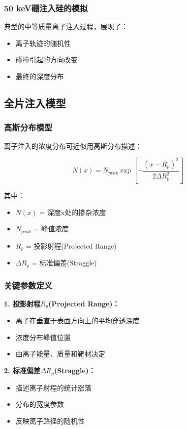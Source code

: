 \documentclass[UTF8,12pt,a4paper]{ctexart}
\begin{document}
\subsubsection{50 keV硼注入硅的模拟}

典型的中等质量离子注入过程，展现了：
\begin{itemize}
    \item 离子轨迹的随机性
    \item 碰撞引起的方向改变
    \item 最终的深度分布
\end{itemize}

\subsection{全片注入模型}

\subsubsection{高斯分布模型}

离子注入的浓度分布可近似用高斯分布描述：

\begin{equation}
N(x) = N_{peak} \exp\left[-\frac{(x-R_p)^2}{2\Delta R_p^2}\right]
\end{equation}

其中：
\begin{itemize}
    \item $N(x)$ = 深度x处的掺杂浓度
    \item $N_{peak}$ = 峰值浓度
    \item $R_p$ = 投影射程(Projected Range)
    \item $\Delta R_p$ = 标准偏差(Straggle)
\end{itemize}

\subsubsection{关键参数定义}

\textbf{1. 投影射程$R_p$(Projected Range)：}
\begin{itemize}
    \item 离子在垂直于表面方向上的平均穿透深度
    \item 浓度分布峰值位置
    \item 由离子能量、质量和靶材决定
\end{itemize}

\textbf{2. 标准偏差$\Delta R_p$(Straggle)：}
\begin{itemize}
    \item 描述离子射程的统计涨落
    \item 分布的宽度参数
    \item 反映离子路径的随机性
\end{itemize}
\end{document}
